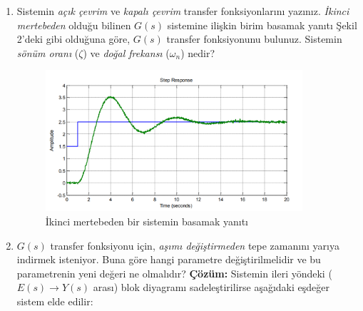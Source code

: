 \documentclass[a4paper,11pt]{article}
\begin{document}
\begin{enumerate}[label=\textbf{\alph*}{.}, leftmargin=\parindent]
    \item Sistemin \emph{açık çevrim} ve \emph{kapalı çevrim} transfer fonksiyonlarını yazınız. \emph{İkinci mertebeden} olduğu bilinen $G(s)$ sistemine ilişkin birim basamak yanıtı Şekil 2'deki gibi olduğuna göre, $G(s)$ transfer fonksiyonunu bulunuz. Sistemin \emph{sönüm oranı} ($\zeta$) ve \emph{doğal frekansı} ($\omega_n$) nedir?
    \begin{figure}[h]
        \centering
        \includegraphics[width=0.9\textwidth]{fig1.png}
        \caption{İkinci mertebeden bir sistemin basamak yanıtı}
        \label{fig:2}
    \end{figure}
    \item $G(s)$ transfer fonksiyonu için, \emph{aşımı değiştirmeden} tepe zamanını yarıya indirmek isteniyor. Buna göre hangi parametre değiştirilmelidir ve bu parametrenin yeni değeri ne olmalıdır?
    \newpage
    \textbf{Çözüm:}
    Sistemin ileri yöndeki ($E(s) \rightarrow Y(s)$ arası) blok diyagramı sadeleştirilirse aşağıdaki eşdeğer sistem elde edilir:
    \begin{figure}[h]
        \centering
\end{figure}
\end{enumerate}
\end{document}
